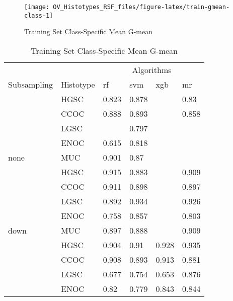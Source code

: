 \documentclass[
]{report}
\begin{document}
\begin{figure}[H]

{\centering \texttt{[image: OV\_Histotypes\_RSF\_files/figure-latex/train-gmean-class-1]} 

}

\caption{Training Set Class-Specific Mean G-mean}\label{fig:train-gmean-class}
\end{figure}

\begin{table}

\caption{\label{tab:train-gmean-class-table}Training Set Class-Specific Mean G-mean}
\centering
\begin{tabular}[t]{l|l|l|l|l|l}
\hline
\multicolumn{2}{c|}{ } & \multicolumn{4}{c}{Algorithms} \\
\cline{3-6}
Subsampling & Histotype & rf & svm & xgb & mr\\
\hline
 & HGSC & 0.823 & 0.878 & \cellcolor[HTML]{90ee90}{1} & 0.83\\
\cline{2-6}
 & CCOC & 0.888 & 0.893 & \cellcolor[HTML]{90ee90}{1} & 0.858\\
\cline{2-6}
 & LGSC & \cellcolor[HTML]{90ee90}{1} & 0.797 & \cellcolor[HTML]{90ee90}{1} & \cellcolor[HTML]{90ee90}{1}\\
\cline{2-6}
 & ENOC & 0.615 & 0.818 & \cellcolor[HTML]{90ee90}{1} & \cellcolor[HTML]{90ee90}{1}\\
\cline{2-6}
\multirow{-5}{*}{\raggedright\arraybackslash none} & MUC & 0.901 & 0.87 & \cellcolor[HTML]{90ee90}{1} & \cellcolor[HTML]{90ee90}{1}\\
\cline{1-6}
 & HGSC & 0.915 & 0.883 & \cellcolor[HTML]{90ee90}{1} & 0.909\\
\cline{2-6}
 & CCOC & 0.911 & 0.898 & \cellcolor[HTML]{90ee90}{1} & 0.897\\
\cline{2-6}
 & LGSC & 0.892 & 0.934 & \cellcolor[HTML]{90ee90}{1} & 0.926\\
\cline{2-6}
 & ENOC & 0.758 & 0.857 & \cellcolor[HTML]{90ee90}{1} & 0.803\\
\cline{2-6}
\multirow{-5}{*}{\raggedright\arraybackslash down} & MUC & 0.897 & 0.888 & \cellcolor[HTML]{90ee90}{1} & 0.909\\
\cline{1-6}
 & HGSC & 0.904 & 0.91 & 0.928 & 0.935\\
\cline{2-6}
 & CCOC & 0.908 & 0.893 & 0.913 & 0.881\\
\cline{2-6}
 & LGSC & 0.677 & 0.754 & 0.653 & 0.876\\
\cline{2-6}
 & ENOC & 0.82 & 0.779 & 0.843 & 0.844\\

\end{tabular}
\end{table}
\end{document}
